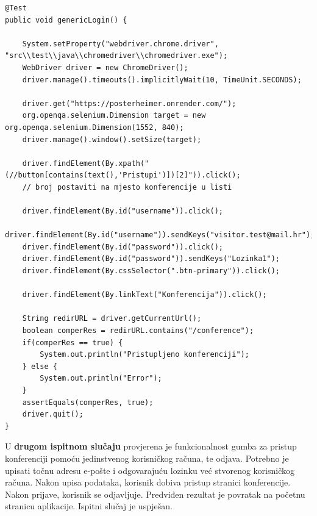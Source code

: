 			
			\begin{lstlisting}
@Test
public void genericLogin() {
	
	System.setProperty("webdriver.chrome.driver", "src\\test\\java\\chromedriver\\chromedriver.exe");
	WebDriver driver = new ChromeDriver();
	driver.manage().timeouts().implicitlyWait(10, TimeUnit.SECONDS);
	
	driver.get("https://posterheimer.onrender.com/");
	org.openqa.selenium.Dimension target = new  org.openqa.selenium.Dimension(1552, 840);
	driver.manage().window().setSize(target);
	
	driver.findElement(By.xpath("(//button[contains(text(),'Pristupi')])[2]")).click();
	// broj postaviti na mjesto konferencije u listi
	
	driver.findElement(By.id("username")).click();
	driver.findElement(By.id("username")).sendKeys("visitor.test@mail.hr");
	driver.findElement(By.id("password")).click();
	driver.findElement(By.id("password")).sendKeys("Lozinka1");
	driver.findElement(By.cssSelector(".btn-primary")).click();
	
	driver.findElement(By.linkText("Konferencija")).click();
	
	String redirURL = driver.getCurrentUrl();
	boolean comperRes = redirURL.contains("/conference");
	if(comperRes == true) {
		System.out.println("Pristupljeno konferenciji");
	} else {
		System.out.println("Error");
	}
	assertEquals(comperRes, true);
	driver.quit();
}
			\end{lstlisting}
			
			U \textbf{drugom ispitnom slučaju} provjerena je funkcionalnost gumba za pristup konferenciji pomoću jedinstvenog korisničkog računa, te odjava. Potrebno je upisati točnu adresu e-pošte i odgovarajuću lozinku već stvorenog korisničkog računa. Nakon upisa podataka, korisnik dobiva pristup stranici konferencije. Nakon prijave, korisnik se odjavljuje. Predviđen rezultat je povratak na početnu stranicu aplikacije. Ispitni slučaj je uspješan.  

